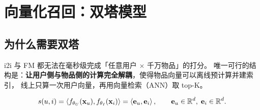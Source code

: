 \section{向量化召回：双塔模型}
\label{sec:two-tower}

\subsection{为什么需要双塔}

i2i 与 FM 都无法在毫秒级完成「任意用户 $\times$ 千万物品」的打分。
唯一可行的结构是：\textbf{让用户侧与物品侧的计算完全解耦}，使得物品向量可以离线预计算并建索引，
线上只算一次用户向量，再用向量检索（ANN）取 top-K。

\begin{equation}
s(u, i) = \left\langle  f_{\theta_U}(\mathbf{x}_u) ,  f_{\theta_I}(\mathbf{x}_i)  \right\rangle
= \left\langle \mathbf{e}_u, \mathbf{e}_i \right\rangle, \qquad
\mathbf{e}_u \in \mathbb{R}^{d}, \; \mathbf{e}_i \in \mathbb{R}^{d} .
\label{eq:two-tower-score}
\end{equation}

